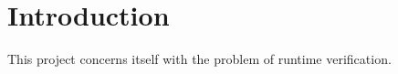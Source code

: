 \section{Introduction}

This project concerns itself with the problem of runtime verification.

\cite{Basin2016}
